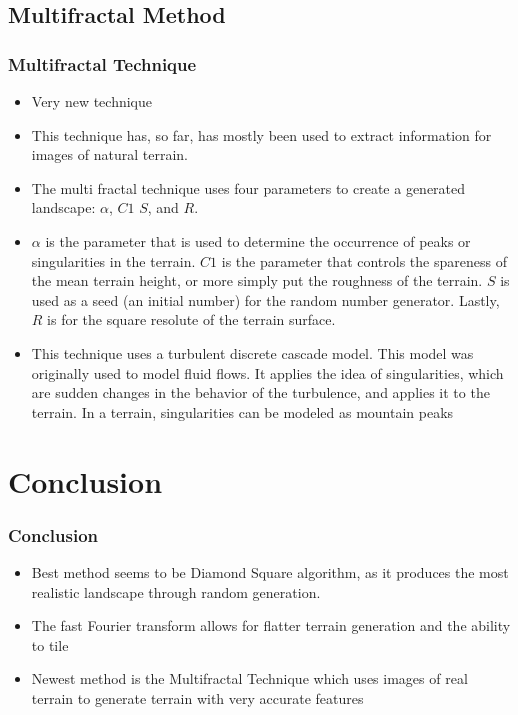 \documentclass{beamer}
\begin{document}
\subsection{Multifractal Method}

\begin{frame}
 \frametitle{Multifractal Technique}
\begin{itemize}
\item Very new technique
\item This technique has, so far, has mostly been used to extract information for images of natural terrain. 
\item The multi fractal technique uses four parameters to create a generated landscape: $\alpha$, $C1$ $S$, and $R$. 
\item $\alpha$ is the parameter that is used to determine the occurrence of peaks or singularities in the terrain. $C1$ is the parameter that controls the spareness of the mean terrain height, or more simply put the roughness of the terrain. $S$ is used as a seed (an initial number) for the random number generator. Lastly, $R$ is for the square resolute of the terrain surface.
\item This technique uses a turbulent discrete cascade model. This model was originally used to model fluid flows. It applies the idea of singularities, which are sudden changes in the behavior of the turbulence, and applies it to the terrain. In a terrain, singularities can be modeled as mountain peaks
\end{itemize}
\end{frame}

\section{Conclusion}

\begin{frame}
 \frametitle{Conclusion}
\begin{itemize}
  \item Best method seems to be Diamond Square algorithm, as it produces the most realistic landscape through random generation.
  \item The fast Fourier transform allows for flatter terrain generation and the ability to tile
 \item Newest method is the Multifractal Technique which uses images of real terrain to generate terrain with very accurate features
  \end{itemize}
  \end{frame}
  
\end{document}
